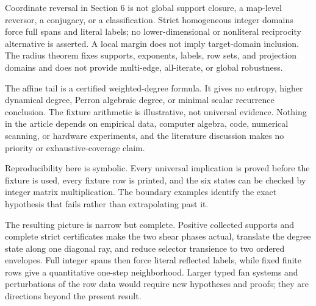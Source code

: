\documentclass[11pt]{article}
\theoremstyle{definition}
\theoremstyle{remark}
\begin{document}
Coordinate reversal in Section 6 is not global support closure, a
map-level reversor, a conjugacy, or a classification.  Strict homogeneous
integer domains force full spans and literal labels; no lower-dimensional
or nonliteral reciprocity alternative is asserted.  A local margin does not
imply target-domain inclusion.  The radius theorem fixes supports,
exponents, labels, row sets, and projection domains and does not provide
multi-edge, all-iterate, or global robustness.

The affine tail is a certified weighted-degree formula.  It gives no
entropy, higher dynamical degree, Perron algebraic degree, or minimal
scalar recurrence conclusion.  The fixture arithmetic is illustrative,
not universal evidence.  Nothing in the article depends on empirical data,
computer algebra, code, numerical scanning, or hardware experiments, and
the literature discussion makes no priority or exhaustive-coverage claim.

Reproducibility here is symbolic.  Every universal implication is proved
before the fixture is used, every fixture row is printed, and the six
states can be checked by integer matrix multiplication.  The boundary
examples identify the exact hypothesis that fails rather than extrapolating
past it.

The resulting picture is narrow but complete.  Positive collected supports
and complete strict certificates make the two shear phases actual, translate
the degree state along one diagonal ray, and reduce selector transience to
two ordered envelopes.  Full integer spans then force literal reflected
labels, while fixed finite rows give a quantitative one-step neighborhood.
Larger typed fan systems and perturbations of the row data would require
new hypotheses and proofs; they are directions beyond the present result.

\clearpage
{}


\end{document}

